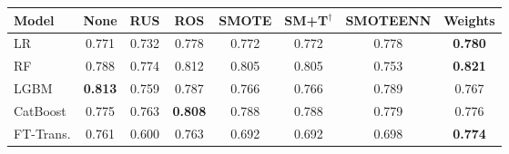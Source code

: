 \begin{tabular}{l c c c c c c c}
\toprule
Model & None & RUS & ROS & SMOTE & SM+T$^{\dagger}$ & SMOTEENN & Weights \\
\midrule
LR         & 0.771 & 0.732 & 0.778 & 0.772 & 0.772 & 0.778 & \textbf{0.780} \\
RF         & 0.788 & 0.774 & 0.812 & 0.805 & 0.805 & 0.753 & \textbf{0.821} \\
LGBM       & \textbf{0.813} & 0.759 & 0.787 & 0.766 & 0.766 & 0.789 & 0.767 \\
CatBoost   & 0.775 & 0.763 & \textbf{0.808} & 0.788 & 0.788 & 0.779 & 0.776 \\
FT-Trans.  & 0.761 & 0.600 & 0.763 & 0.692 & 0.692 & 0.698 & \textbf{0.774} \\
\bottomrule
\end{tabular}
